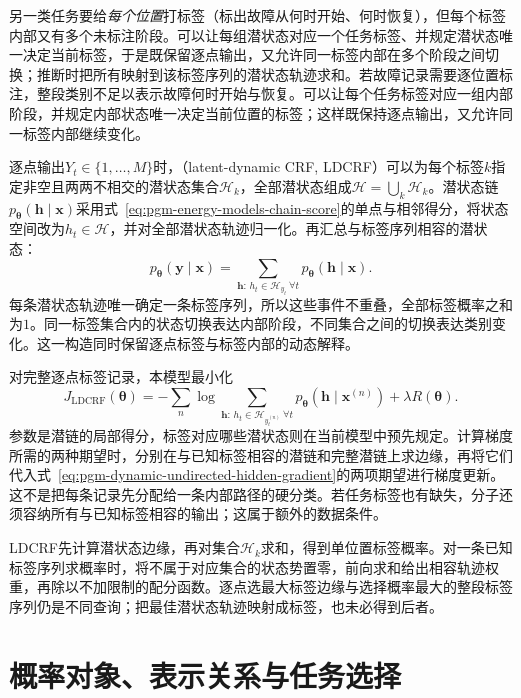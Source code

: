 另一类任务要给\emph{每个位置}打标签（标出故障从何时开始、何时恢复），但每个标签内部又有多个未标注阶段。可以让每组潜状态对应一个任务标签、并规定潜状态唯一决定当前标签，于是既保留逐点输出，又允许同一标签内部在多个阶段之间切换；推断时把所有映射到该标签序列的潜状态轨迹求和。若故障记录需要逐位置标注，整段类别不足以表示故障何时开始与恢复。可以让每个任务标签对应一组内部阶段，并规定内部状态唯一决定当前位置的标签；这样既保持逐点输出，又允许同一标签内部继续变化。

逐点输出$Y_t\in\{1,\ldots,M\}$时，（latent-dynamic CRF, LDCRF）可以为每个标签$k$指定非空且两两不相交的潜状态集合$\mathcal H_k$，全部潜状态组成$\mathcal H=\bigcup_k\mathcal H_k$。潜状态链$p_{\bm\theta}(\bm h\mid\bm x)$采用式~\eqref{eq:pgm-energy-models-chain-score}的单点与相邻得分，将状态空间改为$h_t\in\mathcal H$，并对全部潜状态轨迹归一化。再汇总与标签序列相容的潜状态：
\begin{equation}
  p_{\bm\theta}(\bm y\mid\bm x)
      =\sum_{\bm h:\,h_t\in\mathcal H_{y_t}\ \forall t}
                    p_{\bm\theta}(\bm h\mid\bm x).
  \label{eq:pgm-dynamic-undirected-ldcrf}
\end{equation}
每条潜状态轨迹唯一确定一条标签序列，所以这些事件不重叠，全部标签概率之和为$1$。同一标签集合内的状态切换表达内部阶段，不同集合之间的切换表达类别变化。这一构造同时保留逐点标签与标签内部的动态解释。

对完整逐点标签记录，本模型最小化
\begin{equation}
  J_{\mathrm{LDCRF}}(\bm\theta)
    =-\sum_n\log\sum_{\bm h:\,h_t\in\mathcal H_{y_t^{(n)}}\ \forall t}
                    p_{\bm\theta}(\bm h\mid\bm x^{(n)})
       +\lambda R(\bm\theta).
  \label{eq:pgm-dynamic-undirected-ldcrf-objective}
\end{equation}
参数是潜链的局部得分，标签对应哪些潜状态则在当前模型中预先规定。计算梯度所需的两种期望时，分别在与已知标签相容的潜链和完整潜链上求边缘，再将它们代入式~\eqref{eq:pgm-dynamic-undirected-hidden-gradient}的两项期望进行梯度更新。这不是把每条记录先分配给一条内部路径的硬分类。若任务标签也有缺失，分子还须容纳所有与已知标签相容的输出；这属于额外的数据条件。

LDCRF先计算潜状态边缘，再对集合$\mathcal H_k$求和，得到单位置标签概率。对一条已知标签序列求概率时，将不属于对应集合的状态势置零，前向求和给出相容轨迹权重，再除以不加限制的配分函数。逐点选最大标签边缘与选择概率最大的整段标签序列仍是不同查询；把最佳潜状态轨迹映射成标签，也未必得到后者。

\section{概率对象、表示关系与任务选择}
\label{sec:pgm-dynamic-undirected-comparison}

